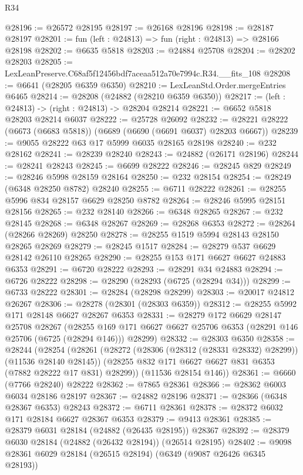 \begin{lexlean}{R34}
\begin{coremodule}
@28196 := @26572 @28195
@28197 := @26168 @28196
@28198 := @28187 @28197
@28201 := fun (left : @24813) => fun (right : @24813) => @28166 @28198
@28202 := @6635 @5818
@28203 := @24884 @25708
@28204 := @28202 @28203
@28205 := LexLeanPreserve.C68af5f12456bdf7aceaa512a70e7994c.R34.__fits_108
@28208 := @6641 (@28205 @6359 @6350)
@28210 := LexLeanStd.Order.mergeEntries @6465
@28214 := @28208 (@24882 (@28210 @6359 @6350))
@28217 := (left : @24813) -> (right : @24813) -> @28204 @28214
@28221 := @6652 @5818 @28203 @28214 @6037
@28222 := @25728 @26092
@28232 := @28221 @28222 (@6673 (@6683 @5818)) (@6689 (@6690 (@6691 @6037) @28203 @6667))
@28239 := @9055 @28222 @63 @17 @5999 @6035 @28165 @28198
@28240 := @232 @28162
@28241 := @28239 @28240
@28243 := @24882 (@26171 @28196)
@28244 := @28241 @28243
@28245 := @6699 @28222
@28246 := @28245 @829
@28249 := @28246 @5998 @28159 @28164
@28250 := @232 @28154
@28254 := @28249 (@6348 @28250 @8782) @28240
@28255 := @6711 @28222
@28261 := @28255 @5996 @834 @28157 @6629 @28250 @8782
@28264 := @28246 @5995 @28151 @28156
@28265 := @232 @28140
@28266 := @6348 @28265
@28267 := @232 @28145
@28268 := @6348 @28267
@28269 := @28268 @6353
@28272 := @28264 (@28266 @28269) @28250
@28278 := @28255 @1519 @5994 @28143 @28150 @28265 @28269
@28279 := @28245 @1517
@28284 := @28279 @537 @6629 @28142 @26110 @28265
@28290 := @28255 @153 @171 @6627 @6627 @24883 @6353
@28291 := @6720 @28222
@28293 := @28291 @34 @24883
@28294 := @6726 @28222
@28298 := @28290 (@28293 (@6725 (@28294 @34)))
@28299 := @6733 @28222
@28301 := @28284 (@28298 @28299)
@28303 := @20017 @24812 @26267
@28306 := @28278 (@28301 (@28303 @6359))
@28312 := @28255 @5992 @171 @28148 @6627 @28267 @6353
@28331 := @28279
    @172
    @6629
    @28147
    @25708
    @28267
    (@28255 @169 @171 @6627 @6627 @25706 @6353 (@28291 @146 @25706 (@6725 (@28294 @146))) @28299)
@28332 := @28303 @6350
@28358 := @28244
    (@28254
      (@28261
        (@28272 (@28306 (@28312 (@28331 @28332) @28299)) (@11536 @28140 @28145))
        (@28255 @832 @171 @6627 @6627 @831 @6353 (@7882 @28222 @17 @831) @28299))
      (@11536 @28154 @146))
@28361 := @6660 (@7766 @28240) @28222
@28362 := @7865 @28361
@28366 := @28362 @6003 @6034 @28186 @28197
@28367 := @24882 @28196
@28371 := @28366 (@6348 @28367 @6353) @28243
@28372 := @6711 @28361
@28378 := @28372 @6032 @171 @28184 @6627 @28367 @6353
@28379 := @9413 @28361
@28385 := @28379 @6031 @28184 (@24882 (@26435 @28195)) @28367
@28392 := @28379 @6030 @28184 (@24882 (@26432 @28194)) (@26514 @28195)
@28402 := @9098 @28361 @6029 @28184 (@26515 @28194) (@6349 (@9087 @26426 @6345 @28193))

\end{coremodule}
\end{lexlean}
